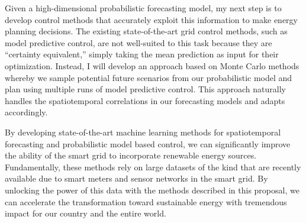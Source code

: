 \documentclass[12pt]{article}
\begin{document}
Given a high-dimensional probabilistic forecasting model, my next step is to develop control methods that accurately exploit this information to make energy planning decisions. The existing state-of-the-art grid control methods, such as model predictive control, are not well-suited to this task because they are ``certainty equivalent,'' simply taking the mean prediction as input for their optimization. Instead, I will develop an approach based on Monte Carlo methods whereby we sample potential future scenarios from our probabilistic model and plan using multiple runs of model predictive control. This approach naturally handles the spatiotemporal correlations in our forecasting models and adapts accordingly.

By developing state-of-the-art machine learning methods for spatiotemporal forecasting and probabilistic model based control, we can significantly improve the ability of the smart grid to incorporate renewable energy sources. Fundamentally, these methods rely on large datasets of the kind that are recently available due to smart meters and sensor networks in the smart grid. By unlocking the power of this data with the methods described in this proposal, we can accelerate the transformation toward sustainable energy with tremendous impact for our country and the entire world.

\renewcommand{\refname}{\vskip -1.5cm}
\footnotesize


\end{document}
